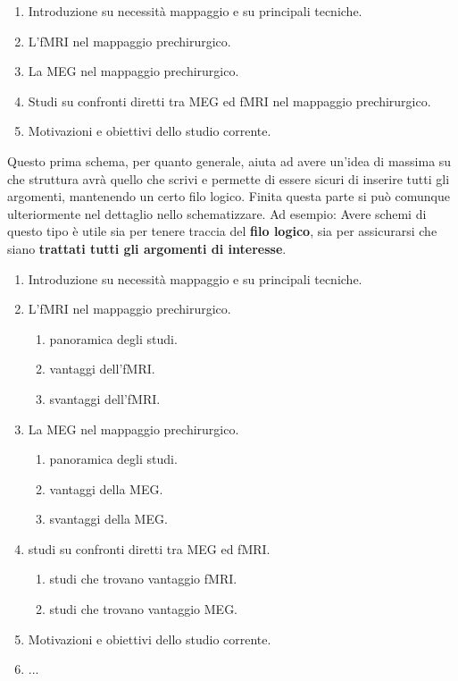 \documentclass[12pt]{book}
\begin{document}
\begin{enumerate}
\item Introduzione su necessità mappaggio e su principali tecniche.
\item L'fMRI nel mappaggio prechirurgico.
\item La MEG nel mappaggio prechirurgico.
\item Studi su confronti diretti tra MEG ed fMRI nel mappaggio prechirurgico.
\item Motivazioni e obiettivi dello studio corrente.
\end{enumerate}

Questo prima schema, per quanto generale, aiuta ad avere un'idea di massima su che struttura avrà quello che scrivi e permette di essere sicuri di inserire tutti gli argomenti, mantenendo un certo filo logico. Finita questa parte si può comunque ulteriormente nel dettaglio nello schematizzare. Ad esempio:
Avere schemi di questo tipo è utile sia per tenere traccia del \textbf{filo logico}, sia per assicurarsi che siano \textbf{trattati tutti gli argomenti di interesse}.

\pagebreak

\begin{enumerate}
\item Introduzione su necessità mappaggio e su principali tecniche.
\item L'fMRI nel mappaggio prechirurgico.
	\begin{enumerate}
	\item panoramica degli studi.
	\item vantaggi dell'fMRI.
	\item svantaggi dell'fMRI.
	\end{enumerate}
\item La MEG nel mappaggio prechirurgico.
\begin{enumerate}
	\item panoramica degli studi.
	\item vantaggi della MEG.
	\item svantaggi della MEG.
	\end{enumerate}
\item studi su confronti diretti tra MEG ed fMRI.
	\begin{enumerate}
	\item studi che trovano vantaggio fMRI.
	\item studi che trovano vantaggio MEG.
	\end{enumerate}
\item Motivazioni e obiettivi dello studio corrente.
\item ...
\end{enumerate}
\end{document}
